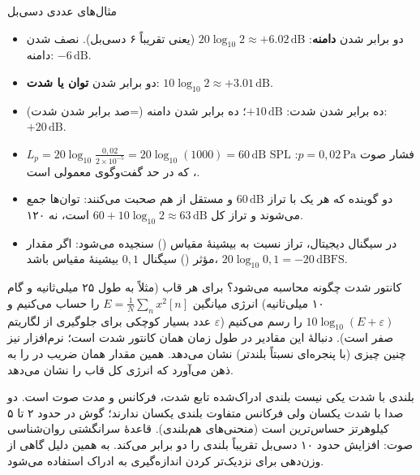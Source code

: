 \begin{addedbox}{مثال‌های عددی دسی‌بل}
\begin{itemize}
  \item دو برابر شدن \textbf{دامنه}: $20\log_{10}2\approx +6.02\,\text{dB}$ (یعنی تقریباً ۶ دسی‌بل). نصف شدن دامنه: $-6\,\text{dB}$.
  \item دو برابر شدن \textbf{توان یا شدت}: $10\log_{10}2\approx +3.01\,\text{dB}$.
  \item ده برابر شدن شدت: $+10\,\text{dB}$؛ ده برابر شدن دامنه (=صد برابر شدن شدت): $+20\,\text{dB}$.
  \item فشار صوت $p=0{,}02\,\text{Pa}$: $L_p = 20\log_{10}\!\frac{0{,}02}{2\times10^{-5}} = 20\log_{10}(1000)=60\,\text{dB SPL}$، که در حد گفت‌وگوی معمولی است.
  \item دو گوینده که هر یک با تراز $60\,\text{dB}$ و مستقل از هم صحبت می‌کنند: توان‌ها جمع می‌شوند و تراز کل $60+10\log_{10}2\approx 63\,\text{dB}$ است، نه ۱۲۰.
  \item در سیگنال دیجیتال، تراز نسبت به بیشینهٔ مقیاس () سنجیده می‌شود: اگر مقدار مؤثر () سیگنال $0{,}1$ بیشینهٔ مقیاس باشد، $20\log_{10}0{,}1=-20\,\text{dBFS}$.
\end{itemize}
\end{addedbox}


\begin{addedbox}{کانتور شدت چگونه محاسبه می‌شود؟}
برای هر قاب (مثلاً به طول ۲۵ میلی‌ثانیه و گام ۱۰ میلی‌ثانیه) انرژی میانگین $E=\frac1N\sum_{n}x^2[n]$ را حساب می‌کنیم و $10\log_{10}(E+\varepsilon)$ را رسم می‌کنیم ($\varepsilon$ عدد بسیار کوچکی برای جلوگیری از لگاریتم صفر است). دنبالهٔ این مقادیر در طول زمان همان کانتور شدت است؛ نرم‌افزار  نیز چنین چیزی (با پنجره‌ای نسبتاً بلندتر) نشان می‌دهد. همین مقدار همان ضریب  در  را به ذهن می‌آورد که انرژی کل قاب را نشان می‌دهد.
\end{addedbox}

\begin{correctionbox}{بلندی با شدت یکی نیست}
بلندی ادراک‌شده تابع شدت، فرکانس و مدت صوت است. دو صدا با شدت یکسان ولی فرکانس متفاوت بلندی یکسان ندارند؛ گوش در حدود ۲ تا ۵ کیلوهرتز حساس‌ترین است (منحنی‌های هم‌بلندی). قاعدهٔ سرانگشتی روان‌شناسی صوت: افزایش حدود ۱۰ دسی‌بل تقریباً بلندی را دو برابر می‌کند. به همین دلیل گاهی از وزن‌دهی  برای نزدیک‌تر کردن اندازه‌گیری به ادراک استفاده می‌شود.
\end{correctionbox}

